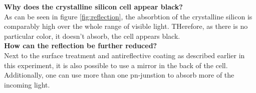 \textbf{Why does the crystalline silicon cell appear black?}\\
As can be seen in figure \ref{fig:reflection}, the absorbtion of the crystalline silicon is comparably high over the whole range of 
visible light. THerefore, as there is no particular color, it doesn't absorb, the cell appears black.\\

\textbf{How can the reflection be further reduced?}\\
Next to the surface treatment and antireflective coating as described earlier in this experiment, it 
is also possible to use a mirror in the back of the cell. Additionally, one can use more than one pn-junstion to 
absorb more of the incoming light.\\

